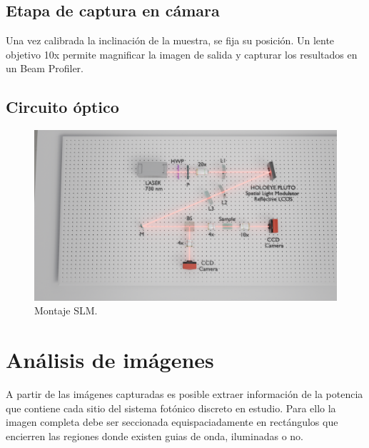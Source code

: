 \subsection{Etapa de captura en cámara}
Una vez calibrada la inclinación de la muestra, se fija su posición. Un lente objetivo 10x permite magnificar la imagen de salida y capturar los resultados en un Beam Profiler.
\subsection{Circuito óptico}
\begin{figure}[H]
	\centering
	\includegraphics[width=\linewidth, trim={21cm 5cm 7cm 5cm},clip]{media/SLM_setupv1}
	\caption{Montaje SLM.}
\end{figure}
\section{Análisis de imágenes \label{sec:analimag}}
A partir de las imágenes capturadas es posible extraer información de la potencia que contiene cada sitio del sistema fotónico discreto en estudio. Para ello la imagen completa debe ser seccionada equispaciadamente en rectángulos que encierren las regiones donde existen guias de onda, iluminadas o no.

